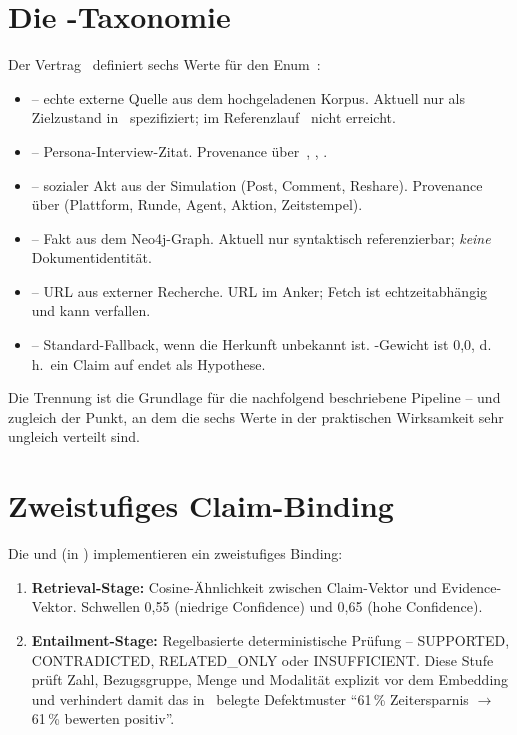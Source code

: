 \section{Die -Taxonomie}\label{sec:sourcekind}

Der Vertrag~ definiert sechs Werte für den Enum~:

\begin{itemize}
  \item {} -- echte externe Quelle aus dem hochgeladenen Korpus. Aktuell nur als Zielzustand in~\cite{adr-0013} spezifiziert; im Referenzlauf~\cite{audit-r2} nicht erreicht.
  \item {} -- Persona-Interview-Zitat. Provenance über~, , .
  \item {} -- sozialer Akt aus der Simulation (Post, Comment, Reshare). Provenance über  (Plattform, Runde, Agent, Aktion, Zeitstempel).
  \item {} -- Fakt aus dem Neo4j-Graph. Aktuell nur syntaktisch referenzierbar; \emph{keine} Dokumentidentität.
  \item {} -- URL aus externer Recherche. URL im Anker; Fetch ist echtzeitabhängig und kann verfallen.
  \item {} -- Standard-Fallback, wenn die Herkunft unbekannt ist. -Gewicht ist 0{,}0, d.\,h.\ ein Claim auf  endet als Hypothese.
\end{itemize}

Die Trennung ist die Grundlage für die nachfolgend beschriebene Pipeline -- und zugleich der Punkt, an dem die sechs Werte in der praktischen Wirksamkeit sehr ungleich verteilt sind.

\section{Zweistufiges Claim-Binding}\label{sec:binding}

Die  und  (in ) implementieren ein zweistufiges Binding:

\begin{enumerate}
  \item \textbf{Retrieval-Stage:} Cosine-Ähnlichkeit zwischen Claim-Vektor und Evidence-Vektor. Schwellen 0{,}55 (niedrige Confidence) und 0{,}65 (hohe Confidence).
  \item \textbf{Entailment-Stage:} Regelbasierte deterministische Prüfung -- SUPPORTED, CONTRADICTED, RELATED\_ONLY oder INSUFFICIENT. Diese Stufe prüft Zahl, Bezugsgruppe, Menge und Modalität explizit vor dem Embedding und verhindert damit das in~\cite{adr-0011} belegte Defektmuster \enquote{61\,\% Zeitersparnis $\to$ 61\,\% bewerten positiv}.
\end{enumerate}

